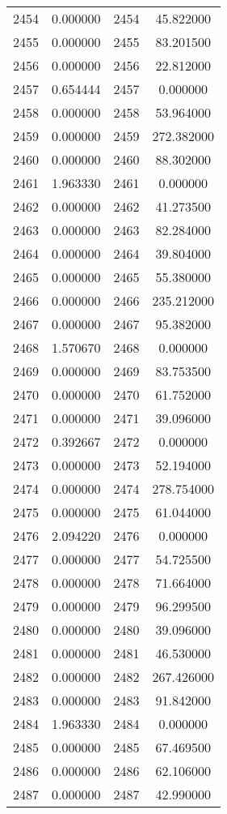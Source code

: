 \documentclass[12pt]{article}
\begin{document}
\begin{longtable}{@{}cccc@{}}
2454 & 0.000000 & 2454 & 45.822000 \\
2455 & 0.000000 & 2455 & 83.201500 \\
2456 & 0.000000 & 2456 & 22.812000 \\
2457 & 0.654444 & 2457 & 0.000000 \\
2458 & 0.000000 & 2458 & 53.964000 \\
2459 & 0.000000 & 2459 & 272.382000 \\
2460 & 0.000000 & 2460 & 88.302000 \\
2461 & 1.963330 & 2461 & 0.000000 \\
2462 & 0.000000 & 2462 & 41.273500 \\
2463 & 0.000000 & 2463 & 82.284000 \\
2464 & 0.000000 & 2464 & 39.804000 \\
2465 & 0.000000 & 2465 & 55.380000 \\
2466 & 0.000000 & 2466 & 235.212000 \\
2467 & 0.000000 & 2467 & 95.382000 \\
2468 & 1.570670 & 2468 & 0.000000 \\
2469 & 0.000000 & 2469 & 83.753500 \\
2470 & 0.000000 & 2470 & 61.752000 \\
2471 & 0.000000 & 2471 & 39.096000 \\
2472 & 0.392667 & 2472 & 0.000000 \\
2473 & 0.000000 & 2473 & 52.194000 \\
2474 & 0.000000 & 2474 & 278.754000 \\
2475 & 0.000000 & 2475 & 61.044000 \\
2476 & 2.094220 & 2476 & 0.000000 \\
2477 & 0.000000 & 2477 & 54.725500 \\
2478 & 0.000000 & 2478 & 71.664000 \\
2479 & 0.000000 & 2479 & 96.299500 \\
2480 & 0.000000 & 2480 & 39.096000 \\
2481 & 0.000000 & 2481 & 46.530000 \\
2482 & 0.000000 & 2482 & 267.426000 \\
2483 & 0.000000 & 2483 & 91.842000 \\
2484 & 1.963330 & 2484 & 0.000000 \\
2485 & 0.000000 & 2485 & 67.469500 \\
2486 & 0.000000 & 2486 & 62.106000 \\
2487 & 0.000000 & 2487 & 42.990000 \\

\end{longtable}
\end{document}
